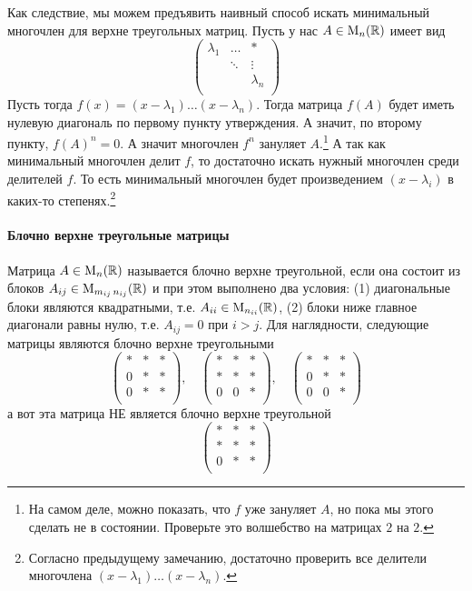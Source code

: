 Как следствие, мы можем предъявить наивный способ искать минимальный многочлен для верхне треугольных матриц. Пусть у нас $A\in\operatorname{M}_{n}(\mathbb R)$ имеет вид
\[
\begin{pmatrix}
{\lambda_1}&{\ldots}&{*}\\
{}&{\ddots}&{\vdots}\\
{}&{}&{\lambda_n}\\
\end{pmatrix}
\]
Пусть тогда $f(x) = (x-\lambda_1) \ldots (x-\lambda_n)$. Тогда матрица $f(A)$ будет иметь нулевую диагональ по первому пункту утверждения. А значит, по второму пункту, $f(A)^n = 0$. А значит многочлен $f^n$ зануляет $A$.\footnote{На самом деле, можно показать, что $f$ уже зануляет $A$, но пока мы этого сделать не в состоянии. Проверьте это волшебство на матрицах $2$ на $2$.} А так как минимальный многочлен делит $f$, то достаточно искать нужный многочлен среди делителей $f$. То есть минимальный многочлен будет произведением $(x-\lambda_i)$ в каких-то степенях.\footnote{Согласно предыдущему замечанию, достаточно проверить все делители многочлена $(x-\lambda_1)\ldots(x-\lambda_n)$.}

\paragraph{Блочно верхне треугольные матрицы} 
Матрица $A\in\operatorname{M}_{n}(\mathbb R)$ называется блочно верхне треугольной, если она состоит из блоков $A_{ij}\in\operatorname{M}_{m_{ij}\,n_{ij}}(\mathbb R)$ и при этом выполнено два условия: (1) диагональные блоки являются квадратными, т.е. $A_{ii}\in\operatorname{M}_{n_{ii}}(\mathbb R)$, (2) блоки ниже главное диагонали равны нулю, т.е. $A_{ij} = 0$ при $i > j$. Для наглядности, следующие матрицы являются блочно верхне треугольными
\[
\begin{pmatrix}
{*}&{*}&{*}\\
{0}&{*}&{*}\\
{0}&{*}&{*}\\
\end{pmatrix},\quad
\begin{pmatrix}
{*}&{*}&{*}\\
{*}&{*}&{*}\\
{0}&{0}&{*}\\
\end{pmatrix},\quad
\begin{pmatrix}
{*}&{*}&{*}\\
{0}&{*}&{*}\\
{0}&{0}&{*}\\
\end{pmatrix}
\]
а вот эта матрица НЕ является блочно верхне треугольной
\[
\begin{pmatrix}
{*}&{*}&{*}\\
{*}&{*}&{*}\\
{0}&{*}&{*}\\
\end{pmatrix}
\]

